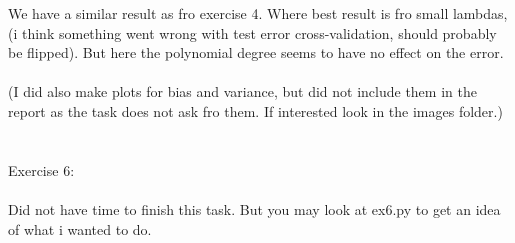 \documentclass[12pt, letterpaper, twoside]{article}
\begin{document}
We have a similar result as fro exercise 4. Where best result is fro small lambdas, (i think something went wrong with test error cross-validation, should probably be flipped). But here the polynomial degree seems to have no effect on the error.\\ 
\newpage
\ \\
(I did also make plots for bias and variance, but did not include them in the report as the task does not ask fro them. If interested look in the images folder.)\\
\ \\
\ \\
Exercise 6:\\
\ \\
Did not have time to finish this task. But you may look at ex6.py to get an idea of what i wanted to do.
\end{document}
